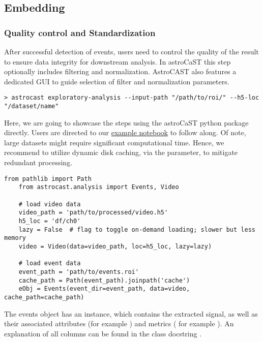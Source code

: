 \subsection{Embedding}\label{subsec:embedding}

\subsubsection{Quality control and Standardization}\label{subsubsec:quality-control}

After successful detection of events, users need to control the quality of the result to ensure data integrity for downstream analysis. In astroCaST this step optionally includes filtering and normalization. AstroCAST also features a dedicated \ac{GUI} to guide selection of filter and normalization parameters.

\begin{lstlisting}[style=bashStyle]
    > astrocast exploratory-analysis --input-path "/path/to/roi/" --h5-loc "/dataset/name"
\end{lstlisting}

Here, we are going to showcase the steps using the astroCaST python package directly. Users are directed to our \href{https://github.com/janreising/astroCAST/blob/baa6ba608914338629fe117836b007a88419ba88/notebooks/examples/B-embedding.ipynb}{example notebook} to follow along. Of note, large datasets might require significant computational time. Hence, we recommend to utilize dynamic disk caching, via the  parameter, to mitigate redundant processing.

\begin{lstlisting}[style=pyStyle]
    from pathlib import Path
    from astrocast.analysis import Events, Video

    # load video data
    video_path = 'path/to/processed/video.h5'
    h5_loc = 'df/ch0'
    lazy = False  # flag to toggle on-demand loading; slower but less memory
    video = Video(data=video_path, loc=h5_loc, lazy=lazy)

    # load event data
    event_path = 'path/to/events.roi'
    cache_path = Path(event_path).joinpath('cache')
    eObj = Events(event_dir=event_path, data=video, cache_path=cache_path)
\end{lstlisting}

The events object has an  instance, which contains the extracted signal, as well as their associated attributes (for example ) and metrics ( for example ). An explanation of all columns can be found in the class docstring .

